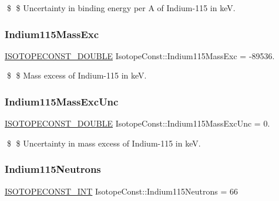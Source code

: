\$ \$ Uncertainty in binding energy per A of Indium-\/115 in keV. \mbox{\label{group___isotope_const-_indium-_in115_ga93d53466a125757b70854a4f3a47b1a7}} 
\subsubsection{\texorpdfstring{Indium115\+Mass\+Exc}{Indium115MassExc}}
{\footnotesize\ttfamily \mbox{\hyperlink{group___isotope_const-_macros_ga8f45a7272ce02c0b4c65c44636ed719a}{I\+S\+O\+T\+O\+P\+E\+C\+O\+N\+S\+T\+\_\+\+D\+O\+U\+B\+LE}} Isotope\+Const\+::\+Indium115\+Mass\+Exc = -\/89536.}

\$ \$ Mass excess of Indium-\/115 in keV. \mbox{\label{group___isotope_const-_indium-_in115_gaba702d7107d26ea08984c868b79d775c}} 
\subsubsection{\texorpdfstring{Indium115\+Mass\+Exc\+Unc}{Indium115MassExcUnc}}
{\footnotesize\ttfamily \mbox{\hyperlink{group___isotope_const-_macros_ga8f45a7272ce02c0b4c65c44636ed719a}{I\+S\+O\+T\+O\+P\+E\+C\+O\+N\+S\+T\+\_\+\+D\+O\+U\+B\+LE}} Isotope\+Const\+::\+Indium115\+Mass\+Exc\+Unc = 0.}

\$ \$ Uncertainty in mass excess of Indium-\/115 in keV. \mbox{\label{group___isotope_const-_indium-_in115_ga9e7cbf3ac9e5c904348ab1330db314a9}} 
\subsubsection{\texorpdfstring{Indium115\+Neutrons}{Indium115Neutrons}}
{\footnotesize\ttfamily \mbox{\hyperlink{group___isotope_const-_macros_ga5f18360b3e99483a35c32d789e62621c}{I\+S\+O\+T\+O\+P\+E\+C\+O\+N\+S\+T\+\_\+\+I\+NT}} Isotope\+Const\+::\+Indium115\+Neutrons = 66}

